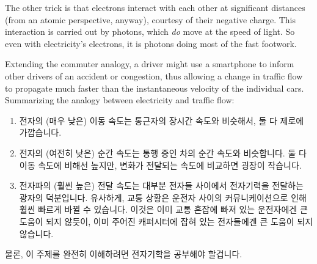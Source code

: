 {	The other trick is that electrons interact with each other at
	significant distances (from an atomic perspective, anyway),
	courtesy of their negative charge.
	This interaction is carried out by photons, which \emph{do}
	move at the speed of light.
	So even with electricity's electrons, it is photons
	doing most of the fast footwork.

	Extending the commuter analogy, a driver might use a smartphone
	to inform other drivers of an accident or congestion, thus
	allowing a change in traffic flow to propagate much faster
	than the instantaneous velocity of the individual cars.
	Summarizing the analogy between electricity and traffic flow:
	\fi

	\begin{enumerate}
	\item	전자의 (매우 낮은) 이동 속도는 통근자의 장시간 속도와 비슷해서,
		둘 다 제로에 가깝습니다.
	\item	전자의 (여전히 낮은) 순간 속도는 통행 중인 차의 순간 속도와
		비슷합니다.
		둘 다 이동 속도에 비해선 높지만, 변화가 전달되는 속도에
		비교하면 굉장이 작습니다.
	\item	전자파의 (훨씬 높은) 전달 속도는 대부분 전자들 사이에서
		전자기력을 전달하는 광자의 덕분입니다.
		유사하게, 교통 상황은 운전자 사이의 커뮤니케이션으로 인해 훨씬
		빠르게 바뀔 수 있습니다.
		이것은 이미 교통 혼잡에 빠져 있는 운전자에겐 큰 도움이 되지
		않듯이, 이미 주어진 캐퍼시터에 잡혀 있는 전자들에겐 큰 도움이
		되지 않습니다.
	\iffalse

	\item	The (very low) drift velocity of an electron is similar
		to the long-term velocity of a commuter, both being
		very nearly zero.
	\item	The (still rather low) instantaneous velocity of
		an electron is similar to the instantaneous velocity
		of a car in traffic.
		Both are much higher than the drift velocity, but
		quite small compared to the rate at which changes
		propagate.
	\item	The (much higher) propagation velocity of an electric
		wave is primarily due to photons transmitting
		electromagnetic force among the electrons.
		Similarly, traffic patterns can change quite quickly
		due to communication among drivers.
		Not that this is necessarily of much help to the
		drivers already stuck in traffic, any more than it
		is to the electrons already pooled in a given capacitor.
	\fi
	\end{enumerate}

	물론, 이 주제를 완전히 이해하려면 전자기학을 공부해야 할겁니다.
	\iffalse

	Of course, to fully understand this topic, you should read
	up on electrodynamics.
	\fi
} \QuickQuizEnd

